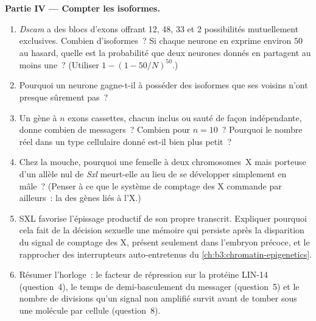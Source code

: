 \begin{problem}
\medskip
\noindent\textbf{Partie IV --- Compter les isoformes.}
\begin{enumerate}[resume]
  \item \emph{Dscam} a des blocs d'exons offrant 12, 48, 33 et 2
        possibilités mutuellement exclusives. Combien d'isoformes~? Si
        chaque neurone en exprime environ $50$ au hasard, quelle est la
        probabilité que deux neurones donnés en partagent au moins
        une~? (Utiliser $1 - (1 -
        50/N)^{50}$.)
  \item Pourquoi un neurone gagne-t-il à posséder des isoformes que ses
        voisins n'ont presque sûrement pas~?
  \item Un gène à $n$ exons cassettes, chacun inclus ou sauté de façon
        indépendante, donne combien de messagers~? Combien pour
        $n = 10$~? Pourquoi le nombre réel dans un type cellulaire
        donné est-il bien plus petit~?
  \item Chez la mouche, pourquoi une femelle à deux chromosomes~X mais
        porteuse d'un allèle nul de \emph{Sxl} meurt-elle au lieu de se
        développer simplement en mâle~? (Penser à ce que le système de
        comptage des X commande par ailleurs~: la 
        des gènes liés à l'X.)
  \item SXL favorise l'épissage productif de son propre transcrit.
        Expliquer pourquoi cela fait de la décision sexuelle une
        mémoire qui persiste après la disparition du signal de comptage
        des X, présent seulement dans l'embryon précoce, et le
        rapprocher des interrupteurs auto-entretenus du
        \cref{ch:b3:chromatin-epigenetics}.
  \item Résumer l'horloge~: le facteur de répression sur la protéine
        LIN-14 (question~4), le temps de demi-basculement du messager
        (question~5) et le nombre de divisions qu'un signal non amplifié
        survit avant de tomber sous une molécule par cellule
        (question~8).
\end{enumerate}
\end{problem}
